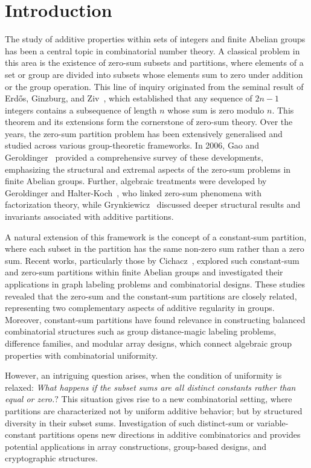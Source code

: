 \documentclass[preprint,11pt]{elsarticle}
\begin{document}

\section{Introduction}

The study of additive properties within sets of integers and finite Abelian groups has been a central topic in combinatorial number theory. A classical problem in this area is the existence of {zero-sum subsets and partitions}, where elements of a set or group are divided into subsets whose elements sum to zero under addition or the group operation. This line of inquiry originated from the seminal result of Erdős, Ginzburg, and Ziv~\cite{Erdos1961}, which established that any sequence of $2n-1$ integers contains a subsequence of length $n$ whose sum is zero modulo $n$. This theorem and its extensions form the cornerstone of zero-sum theory. Over the years, the {zero-sum partition problem} has been extensively generalised and studied across various group-theoretic frameworks. In 2006, Gao and Geroldinger~\cite{MR2313123} provided a comprehensive survey of these developments, emphasizing the structural and extremal aspects of the zero-sum problems in finite Abelian groups. Further, algebraic treatments were developed by Geroldinger and Halter-Koch~\cite{zbMATH05018184}, who linked zero-sum phenomena with factorization theory, while Grynkiewicz~\cite{zbMATH06162097} discussed deeper structural results and invariants associated with additive partitions.

A natural extension of this framework is the concept of a {constant-sum partition}, where each subset in the partition has the same non-zero sum rather than a zero sum. Recent works, particularly those by Cichacz~\cite{MR3720542,MR3761934}, explored such constant-sum and zero-sum partitions within finite Abelian groups and investigated their applications in graph labeling problems and combinatorial designs. These studies revealed that the zero-sum and the constant-sum partitions are closely related, representing two complementary aspects of additive regularity in groups. Moreover, constant-sum partitions have found relevance in constructing balanced combinatorial structures such as group distance-magic labeling problems, difference families, and modular array designs, which connect algebraic group properties with combinatorial uniformity.


However, an intriguing question arises, when the condition of uniformity is relaxed: \emph{What happens if the subset sums are all distinct constants rather than equal or zero.$?$} This situation gives rise to a new combinatorial setting, where partitions are characterized not by uniform additive behavior; but by structured diversity in their subset sums. Investigation of such {distinct-sum} or {variable-constant partitions} opens new directions in additive combinatorics and provides potential applications in array constructions, group-based designs, and cryptographic structures.
\end{document}
